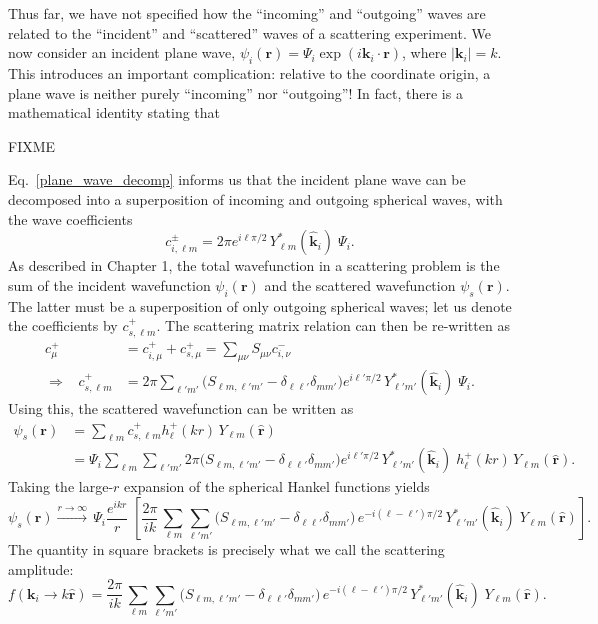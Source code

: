 \documentclass[pra,12pt]{revtex4}
\begin{document}
Thus far, we have not specified how the ``incoming'' and ``outgoing''
waves are related to the ``incident'' and ``scattered'' waves of a
scattering experiment.  We now consider an incident plane wave,
$\psi_i(\mathbf{r}) = \Psi_i \exp(i\mathbf{k}_i\cdot \mathbf{r})$,
where $|\mathbf{k}_i| = k$.  This introduces an important
complication: relative to the coordinate origin, a plane wave is
neither purely ``incoming'' nor ``outgoing''!  In fact, there is a
mathematical identity stating that

FIXME

Eq.~\eqref{plane_wave_decomp}
informs us that the incident plane wave can be decomposed into a
superposition of incoming and outgoing spherical waves, with the wave
coefficients
\begin{equation}
  c^{\pm}_{i, \ell m} = 2 \pi e^{i\ell\pi/2} \, Y_{\ell m}^*(\hat{\mathbf{k}}_i)\; \Psi_i.
\end{equation}
As described in Chapter 1, the total wavefunction in a scattering
problem is the sum of the incident wavefunction $\psi_i(\mathbf{r})$
and the scattered wavefunction $\psi_s(\mathbf{r})$.  The latter must
be a superposition of only outgoing spherical waves; let us denote the
coefficients by $c^+_{s,\ell m}$.  The scattering matrix relation can
then be re-written as
\begin{align}
  c^+_\mu &= c^+_{i,\mu} + c^+_{s,\mu} = \sum_{\mu\nu} S_{\mu\nu} c^-_{i,\nu} \\ \Rightarrow \;\;\; c^+_{s,\ell m} &= 2 \pi \sum_{\ell' m'} \Big(S_{\ell m, \ell' m'} - \delta_{\ell \ell'}\delta_{mm'}\Big) e^{i\ell'\pi/2} \, Y_{\ell' m'}^*(\hat{\mathbf{k}}_i)\; \Psi_i.
\end{align}
Using this, the scattered wavefunction can be written as
\begin{equation}
  \begin{aligned}\psi_s(\mathbf{r}) &= \sum_{\ell m} c^+_{s,\ell m} h_{\ell}^+(kr) \, Y_{\ell m}(\hat{\mathbf{r}}) \\ &= \Psi_i \sum_{\ell m} \sum_{\ell' m'} 2 \pi \Big(S_{\ell m, \ell' m'} - \delta_{\ell \ell'}\delta_{mm'}\Big) e^{i\ell'\pi/2} \, Y_{\ell' m'}^*(\hat{\mathbf{k}}_i)\; h_{\ell}^+(kr) \, Y_{\ell m}(\hat{\mathbf{r}}).\end{aligned}
\end{equation}
Taking the large-$r$ expansion of the spherical Hankel functions yields
\begin{equation}
  \psi_s(\mathbf{r}) \overset{r\rightarrow\infty}{\longrightarrow} \, \Psi_i \frac{e^{ikr}}{r} \; \left[ \frac{2 \pi}{ik}\, \sum_{\ell m} \sum_{\ell' m'} \Big(S_{\ell m, \ell' m'} - \delta_{\ell \ell'}\delta_{mm'}\Big) \, e^{-i(\ell-\ell')\pi/2} \, Y_{\ell' m'}^*(\hat{\mathbf{k}}_i)\; Y_{\ell m}(\hat{\mathbf{r}})\right].
\end{equation}
The quantity in square brackets is precisely what we call the
scattering amplitude:
\begin{equation}
  f(\mathbf{k}_i \rightarrow k\hat{\mathbf{r}}) =  \frac{2 \pi}{ik}\, \sum_{\ell m} \sum_{\ell' m'} \Big(S_{\ell m, \ell' m'} - \delta_{\ell \ell'}\delta_{mm'}\Big) \, e^{-i(\ell-\ell')\pi/2} \, Y_{\ell' m'}^*(\hat{\mathbf{k}}_i)\; Y_{\ell m}(\hat{\mathbf{r}}).
\end{equation}
\end{document}
